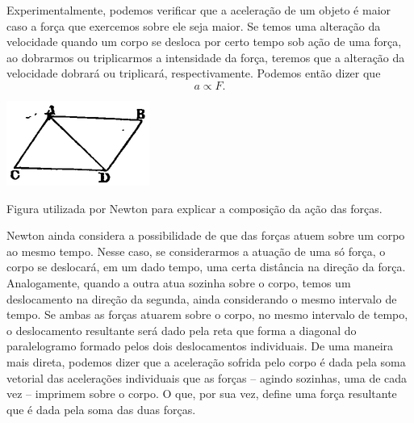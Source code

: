 Experimentalmente, podemos verificar que a aceleração de um objeto é maior caso a força que exercemos sobre ele seja maior. Se temos uma alteração da velocidade quando um corpo se desloca por certo tempo sob ação de uma força, ao dobrarmos ou triplicarmos a intensidade da força, teremos que a alteração da velocidade dobrará ou triplicará, respectivamente. Podemos então dizer que
\begin{equation}
  a \propto F.
\end{equation}

\begin{marginfigure}[1cm]
\includegraphics{Fig/177px-Principia1846-084.png}
\caption{Figura utilizada por Newton para explicar a composição da ação das forças.}
\end{marginfigure}

Newton ainda considera a possibilidade de que das forças atuem sobre um corpo ao mesmo tempo. Nesse caso, se considerarmos a atuação de uma só força, o corpo se deslocará, em um dado tempo, uma certa distância na direção da força. Analogamente, quando a outra atua sozinha sobre o corpo, temos um deslocamento na direção da segunda, ainda considerando o mesmo intervalo de tempo. Se ambas as forças atuarem sobre o corpo, no mesmo intervalo de tempo, o deslocamento resultante será dado pela reta que forma a diagonal do paralelogramo formado pelos dois deslocamentos individuais. De uma maneira mais direta, podemos dizer que a aceleração sofrida pelo corpo é dada pela soma vetorial das acelerações individuais que as forças -- agindo sozinhas, uma de cada vez -- imprimem sobre o corpo. O que, por sua vez, define uma força resultante que é dada pela soma das duas forças.


